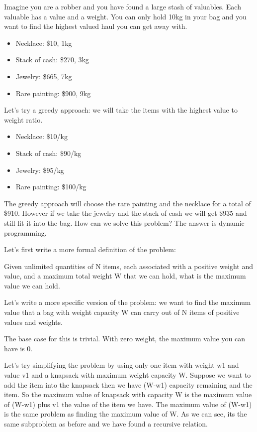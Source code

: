 \documentclass[11pt,oneside]{book}
\begin{document}
Imagine you are a robber and you have found a large stash of valuables. Each valuable has a value and a weight. You can only hold 10kg in your bag and you want to find the highest valued haul you can get away with.

\begin{itemize}
\item Necklace: \$10, 1kg
\item Stack of cash: \$270, 3kg
\item Jewelry: \$665, 7kg
\item Rare painting: \$900, 9kg
\end{itemize}

Let's try a greedy approach: we will take the items with the highest value to weight ratio.

\begin{itemize}
\item Necklace: \$10/kg
\item Stack of cash: \$90/kg
\item Jewelry: \$95/kg
\item Rare painting: \$100/kg
\end{itemize}

The greedy approach will choose the rare painting and the necklace for a total of \$910. However if we take the jewelry and the stack of cash we will get \$935 and still fit it into the bag. How can we solve this problem? The answer is dynamic programming.

Let's first write a more formal definition of the problem:

Given unlimited quantities of N items, each associated with a positive weight and value, and a maximum total weight W that we can hold, what is the maximum value we can hold.

Let's write a more specific version of the problem: we want to find the maximum value that a bag with weight capacity W can carry out of N items of positive values and weights.

The base case for this is trivial. With zero weight, the maximum value you can have is 0.

Let's try simplifying the problem by using only one item with weight w1 and value v1 and a knapsack with maximum weight capacity W. Suppose we want to add the item into the knapsack then we have (W-w1) capacity remaining and the item. So the maximum value of knapsack with capacity W is the maximum value of (W-w1) plus v1 the value of the item we have. The maximum value of (W-w1) is the same problem as finding the maximum value of W. As we can see, its the same subproblem as before and we have found a recursive relation.
\end{document}
